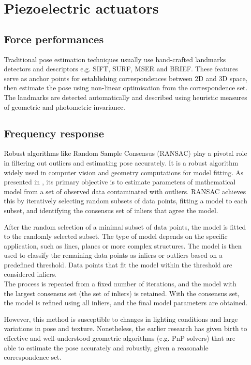 \section{Piezoelectric actuators}

\subsection{Force performances}
Traditional pose estimation techniques usually use hand-crafted landmarks detectors and descriptors e.g. SIFT, SURF, MSER and BRIEF. These features serve as anchor points for establishing correspondences between 2D and 3D space, then estimate the pose using non-linear optimisation from the correspondence set. The landmarks are detected automatically and described using heuristic measures of geometric and photometric invariance.

\subsection{Frequency response}
Robust algorithms like Random Sample Consensus (RANSAC) \cite{RANSAC} play a pivotal role in filtering out outliers and estimating pose accurately. It is a robust algorithm widely used in computer vision and geometry computations for model fitting. As presented in \cite{Lowe2004DistinctiveIF}, its primary objective is to estimate parameters of mathematical model from a set of observed data contaminated with outliers. RANSAC achieves this by iteratively selecting random subsets of data points, fitting a model to each subset, and identifying the consensus set of inliers that agree the model.

After the random selection of a minimal subset of data points, the model is fitted to the randomly selected subset. The type of model depends on the specific application, such as lines, planes or more complex structures. The model is then used to classify the remaining data points as inliers or outliers based on a predefined threshold. Data points that fit the model within the threshold are considered inliers.\\
The process is repeated from a fixed number of iterations, and the model with the largest consensus set (the set of inliers) is retained. With the consensus set, the model is refined using all inliers, and the final model parameters are obtained.

However, this method is susceptible to changes in lighting conditions and large variations in pose and texture. Nonetheless, the earlier research has given birth to effective and well-understood geometric algorithms (e.g. PnP solvers) that are able to estimate the pose accurately and robustly, given a reasonable correspondence set.

